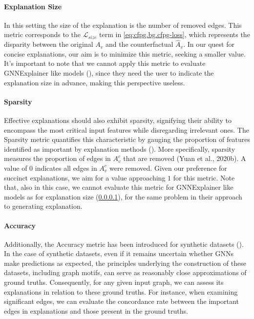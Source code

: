 \documentclass[binding=0.6cm]{sapthesis}
\newcommand{\mycite}[1]{(\cite{#1})}
\begin{document}
\paragraph{Explanation Size}
\label{sec:expRes.expl-size}
In this setting the size of the explanation is the number of removed edges. This metric corresponds to the $\mathcal{L}_{size}$ term in \cref{eq:cfpg.bg.cfpg-loss}, which represents the disparity between the original $A_v$ and the counterfactual $\hat{A}_v$. In our quest for concise explanations, our aim is to minimize this metric, seeking a smaller value. It's important to note that we cannot apply this metric to evaluate GNNExplainer like models (\cite{luo2020-pgexplainer,yuan2020-xgnn,vu2020-pgm-explainer,bajaj2022-robustCF}), since they need the user to indicate the explanation size in advance, making this perspective useless.


\paragraph{Sparsity}
\label{sec:expRes.sparsity}
Effective explanations should also exhibit sparsity, signifying their ability to encompass the most critical input features while disregarding irrelevant ones. The Sparsity metric quantifies this characteristic by gauging the proportion of features identified as important by explanation methods \mycite{pope2019-CVPR}.
More specifically, sparsity measures the proportion of edges in $A^c_v$ that are removed (Yuan et al., 2020b). A value of $0$ indicates all edges in $A^c_v$ were removed. Given our preference for succinct explanations, we aim for a value approaching $1$ for this metric. Note that, also in this case, we cannot evaluate this metric for GNNExplainer like models as for explanation size (\cref{sec:expRes.expl-size}), for the same problem in their approach to generating explanation.


\paragraph{Accuracy}
\label{sec:expRes.accuracy}
Additionally, the Accuracy metric has been introduced for synthetic datasets \mycite{ying2019-gnnexplainer,sanchez2020-attributeGNNs}. In the case of synthetic datasets, even if it remains uncertain whether GNNs make predictions as expected, the principles underlying the construction of these datasets, including graph motifs, can serve as reasonably close approximations of ground truths. Consequently, for any given input graph, we can assess its explanations in relation to these ground truths. For instance, when examining significant edges, we can evaluate the concordance rate between the important edges in explanations and those present in the ground truths.
\end{document}
